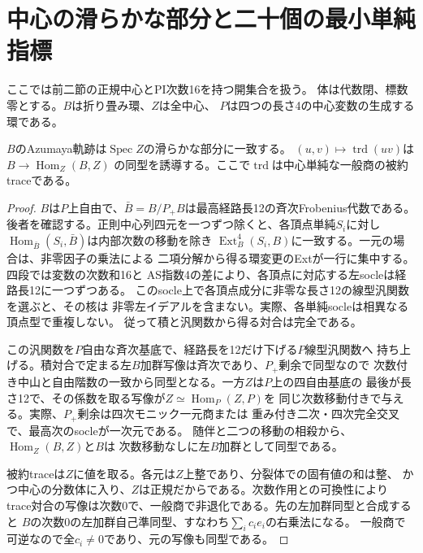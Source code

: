 \section{中心の滑らかな部分と二十個の最小単純指標}
\label{sec:minimum-central-characters}
ここでは前二節の正規中心とPI次数16を持つ開集合を扱う。
体は代数閉、標数零とする。$B$は折り畳み環、$Z$は全中心、
$P$は四つの長さ4の中心変数の生成する環である。

\begin{proposition}\label{prop:smooth-azumaya}
$B$のAzumaya軌跡は$\operatorname{Spec}Z$の滑らかな部分に一致する。
$(u,v)\mapsto\operatorname{trd}(uv)$は$B\to\operatorname{Hom}_Z(B,Z)$
の同型を誘導する。ここで$\operatorname{trd}$は中心単純な一般商の被約traceである。
\end{proposition}
\begin{proof}
$B$は$P$上自由で、$\bar B=B/P_+B$は最高経路長12の斉次Frobenius代数である。
後者を確認する。正則中心列四元を一つずつ除くと、各頂点単純$S_i$に対し
$\operatorname{Hom}_{\bar B}(S_i,\bar B)$は内部次数の移動を除き
$\operatorname{Ext}^4_B(S_i,B)$に一致する。一元の場合は、非零因子の乗法による
二項分解から得る環変更のExtが一行に集中する。四段では変数の次数和16と
AS指数4の差により、各頂点に対応する左socleは経路長12に一つずつある。
このsocle上で各頂点成分に非零な長さ12の線型汎関数を選ぶと、その核は
非零左イデアルを含まない。実際、各単純socleは相異なる頂点型で重複しない。
従って積と汎関数から得る対合は完全である。

この汎関数を$P$自由な斉次基底で、経路長を12だけ下げる$P$線型汎関数へ
持ち上げる。積対合で定まる左$B$加群写像は斉次であり、$P_+$剰余で同型なので
次数付き中山と自由階数の一致から同型となる。一方$Z$は$P$上の四自由基底の
最後が長さ12で、その係数を取る写像が$Z\simeq\operatorname{Hom}_P(Z,P)$を
同じ次数移動付きで与える。実際、$P_+$剰余は四次モニック一元商または
重み付き二次・四次完全交叉で、最高次のsocleが一次元である。
随伴と二つの移動の相殺から、$\operatorname{Hom}_Z(B,Z)$と$B$は
次数移動なしに左$B$加群として同型である。

被約traceは$Z$に値を取る。各元は$Z$上整であり、分裂体での固有値の和は整、
かつ中心の分数体に入り、$Z$は正規だからである。次数作用との可換性により
trace対合の写像は次数0で、一般商で非退化である。先の左加群同型と合成すると
$B$の次数0の左加群自己準同型、すなわち$\sum_i c_i e_i$の右乗法になる。
一般商で可逆なので全$c_i\ne0$であり、元の写像も同型である。


\end{proof}
